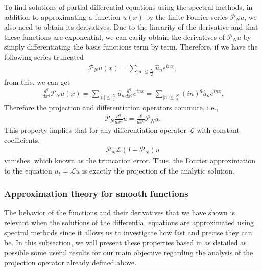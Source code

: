 	To find solutions of partial differential equations using the spectral methods, in addition to approximating a function $u(x)$ by the finite Fourier series $\mathcal{P}_N u$, we also need to obtain its derivatives. Due to the linearity of the derivative and that these functions are exponential, we can easily obtain the derivatives of $\mathcal{P}_N u$ by simply differentiating the basis functions term by term. Therefore, if we have the following series truncated \\
 	\begin{align*}
   		\mathcal{P}_N u(x) =  \displaystyle \sum_{ |n| \leq \frac {N}{2}} \hat{u}_{n} e^{inx},
   	\end{align*}
    from this, we can get
   	\begin{align*}
   		\frac{d^q}{dx^q} \mathcal{P}_N u(x) = \displaystyle \sum_{ |n| \leq \frac {N}{2}} \hat{u}_{n} \frac{d^q}{dx^q} e^{inx} = \displaystyle \sum_{ |n| \leq \frac {N}{2}} (in)^q \hat{u}_{n}e^{inx}.
   	\end{align*}
    Therefore the projection and differentiation operators commute, i.e.,
    	\begin{align*}
    	\mathcal{P}_N \frac{d^q}{dx^q} u = \frac{d^q}{dx^q}\mathcal{P}_N u.
    	\end{align*}
    This property implies that for any differentiation operator $\mathcal{L}$ with constant coefficients,	
    	\begin{align*}
    	\mathcal{P}_N \mathcal{L} (I - \mathcal{P}_N)u
    	\end{align*}
     vanishes, which known as the truncation error. Thus, the Fourier approximation to the equation $u_t = \mathcal{L}u$ is exactly the projection of the analytic solution. 

    \subsubsection{Approximation theory for smooth functions}
    
    The behavior of the functions and their derivatives that we have shown is relevant when the solutions of the differential equations are approximated using spectral methods since it allows us to investigate how fast and precise they can be. In this subsection, we will present these properties based in \cite{gottlieb2007} as detailed as possible some useful results for our main objective regarding the analysis of the projection operator already defined above. \\
    
